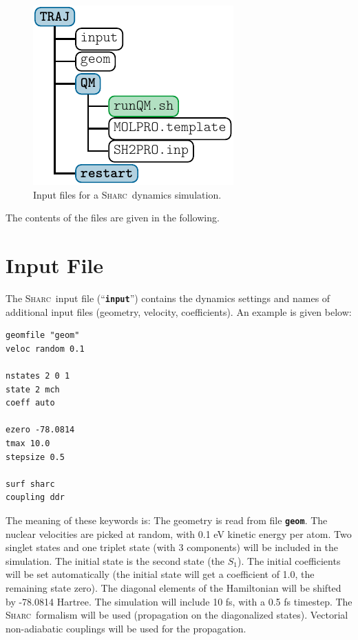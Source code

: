 \documentclass[a4paper,11pt,DIV=15,openany]{scrbook}
\newcommand{\sharc}{\textsc{Sharc}}
\newcommand{\ttt}[1]{\textbf{\texttt{#1}}}
\newenvironment{example}{
  \vspace{0mm}
  \definecolor{shadecolor}{HTML}{E4F4FF}
  \begin{shaded}
}{
  \end{shaded}
}
\begin{document}
\begin{figure}
  \centering
  \includegraphics[]{img/dir_traj/dir_traj.pdf}
  \caption{Input files for a \sharc\ dynamics simulation.}
  \label{fig:traj_dir}
\end{figure}

The contents of the files are given in the following.

\section{Input File}

The \sharc\ input file (``\ttt{input}'') contains the dynamics settings and names of additional input files (geometry, velocity, coefficients). An example is given below:
\begin{example}\vspace{-8mm}
\begin{verbatim}
geomfile "geom"
veloc random 0.1

nstates 2 0 1 
state 2 mch
coeff auto

ezero -78.0814
tmax 10.0
stepsize 0.5

surf sharc
coupling ddr
\end{verbatim}\vspace{-5mm}
\end{example}

The meaning of these keywords is: The geometry is read from file \ttt{geom}. The nuclear velocities are picked at random, with 0.1 eV kinetic energy per atom. Two singlet states and one triplet state (with 3 components) will be included in the simulation. The initial state is the second state (the $S_1$). The initial coefficients will be set automatically (the initial state will get a coefficient of 1.0, the remaining state zero). The diagonal elements of the Hamiltonian will be shifted by -78.0814 Hartree. The simulation will include 10 fs, with a 0.5 fs timestep. The \sharc\ formalism will be used (propagation on the diagonalized states). Vectorial non-adiabatic couplings will be used for the propagation. 
\end{document}
